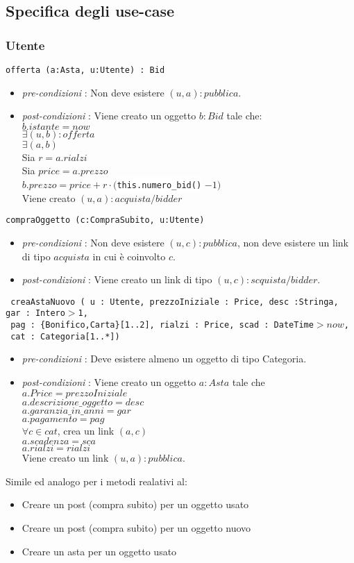 \documentclass[12pt, letterpaper]{article}
\newcommand{\code}[1]{\colorbox{light-gray}{\texttt{#1}}}
\newcommand{\codee}[1]{\colorbox{white}{\texttt{#1}}}
\begin{document}
\subsection{Specifica degli use-case}
\subsubsection{Utente}
\code{offerta (a:Asta, u:Utente) :  Bid }\begin{itemize}
    \item \textit{pre-condizioni} : Non deve esistere $(u,a):pubblica$. 
    \item \textit{post-condizioni} : Viene creato un oggetto $b:Bid$ tale che:\\ 
     $b.istante=now$ \\
     $\exists (u,b) : offerta$ \\
     $\exists (a,b) $ \\ 
     Sia $r=a.rialzi$\\ 
     Sia $price=a.prezzo$\\
     $b.prezzo = price + r\cdot ($\codee{this.numero\_bid()} $-1 )$\\
     Viene creato $(u,a):acquista/bidder$ 
\end{itemize}
\code{compraOggetto (c:CompraSubito, u:Utente) }\begin{itemize}
    \item \textit{pre-condizioni} : Non deve esistere $(u,c):pubblica$, non deve 
    esistere un link di tipo $acquista$ in cui è coinvolto $c$. 
    \item \textit{post-condizioni} : Viene creato un link di tipo $(u,c):scquista/bidder$.
\end{itemize}
\code{ creaAstaNuovo ( u : Utente, prezzoIniziale : Price, desc :Stringa, gar : Intero$>$1,
}\\\code{ pag : \{Bonifico,Carta\}[1..2],
rialzi : Price, scad : DateTime$> now$,}\\\code{ cat : Categoria[1..*])}\begin{itemize}
    \item \textit{pre-condizioni} : Deve esistere almeno un oggetto di tipo Categoria.
    \item \textit{post-condizioni} : Viene creato un oggetto $a:Asta$ tale che\\ 
    $a.Price = prezzoIniziale$\\ 
    $a.descrizione\_oggetto = desc$\\ 
    $a.garanzia\_in\_anni = gar$\\ 
    $a.pagamento = pag$\\
    $\forall c \in cat$, crea un link $(a,c)$\\
    $a.scadenza=sca$ \\
    $a.rialzi=rialzi$\\
    Viene creato un link $(u,a):pubblica$.
\end{itemize}
Simile ed analogo per i metodi realativi al:\begin{itemize}
    \item Creare un post (compra subito) per un oggetto usato 
    \item Creare un post (compra subito) per un oggetto nuovo 
    \item Creare un asta per un oggetto usato
\end{itemize}
\end{document}
